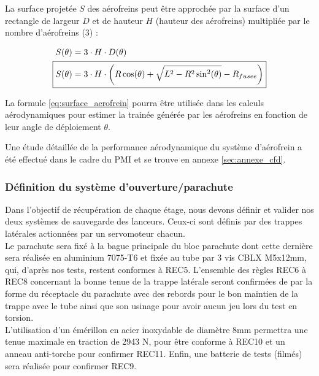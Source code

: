 La surface projetée $S$ des aérofreins peut être approchée par la surface d'un rectangle de largeur $D$ et de hauteur $H$ (hauteur
des aérofreins) multipliée par le nombre d'aérofreins (3) :

\begin{align}
    S(\theta) &= 3 \cdot H \cdot D(\theta) \\
    \Aboxed{S(\theta) &= 3 \cdot H \cdot \left( R \cos(\theta) + \sqrt{L^2 - R^2 \sin^2(\theta)} - R_{fusee} \right)} \label{eq:surface_aerofrein}
\end{align}

La formule \ref{eq:surface_aerofrein} pourra être utilisée dans les calculs aérodynamiques pour estimer la trainée générée par les
aérofreins en fonction de leur angle de déploiement $\theta$.\\


Une étude détaillée de la performance aérodynamique du système d'aérofrein a été effectué dans le cadre du \acrshort{PMI} et se
trouve en annexe \ref{sec:annexe_cfd}.

\newpage

\subsubsection{Définition du système d'ouverture/parachute}
\label{subsec:defpara}

Dans l'objectif de récupération de chaque étage, nous devons définir et valider nos deux systèmes de sauvegarde des lanceurs.
Ceux-ci sont définis par des trappes latérales actionnées par un servomoteur chacun.\\

Le parachute sera fixé à la bague principale du bloc parachute dont cette dernière sera réalisée en aluminium 7075-T6 et fixée
au tube par 3 vis CBLX M5x12mm, qui, d'après nos tests, restent conformes à REC5. L'ensemble des règles REC6 à REC8 concernant la
bonne tenue de la trappe latérale seront confirmées de par la forme du réceptacle du parachute avec des rebords pour le bon
maintien de la trappe avec le tube ainsi que son usinage pour avoir aucun jeu lors du test en torsion. \\

L'utilisation d'un émérillon en acier inoxydable de diamètre 8mm permettra une tenue maximale en traction de 2943 N, pour être
conforme à REC10 et un anneau anti-torche pour confirmer REC11. Enfin, une batterie de tests (filmés) sera réalisée pour confirmer REC9.\\

